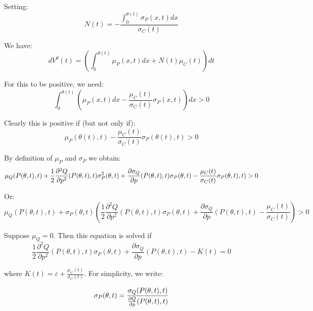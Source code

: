 \documentclass{article}
\begin{document}
Setting:%
\begin{equation*}
N(t)=-\frac{\int_{0}^{\theta (t)}\sigma _{P}(x,t)dx}{\sigma _{C}(t)}
\end{equation*}%
\bigskip

We have:%
\begin{equation*}
dV^{\theta }(t)=\left( \int_{0}^{\theta (t)}\mu _{P}(x,t)dx+N(t)\mu
_{C}(t)\right) dt
\end{equation*}

For this to be positive, we need:%
\begin{equation*}
\int_{0}^{\theta (t)}\left( \mu _{P}(x,t)dx-\frac{\mu _{C}(t)}{\sigma _{C}(t)%
}\sigma _{P}(x,t)\right) dx>0
\end{equation*}

Clearly this is positive if (but not only if):%
\begin{equation*}
\mu _{P}(\theta (t),t)-\frac{\mu _{C}(t)}{\sigma _{C}(t)}\sigma _{P}(\theta
(t),t)>0
\end{equation*}

By definition of $\mu _{P}$ and $\sigma _{P}$ we obtain:%
\begin{equation*}
\mu _{Q}(P(\theta ,t),t)+\frac{1}{2}\frac{\partial ^{2}Q}{\partial p^{2}}%
(P(\theta ,t),t)\sigma _{P}^{2}(\theta ,t)+\frac{\partial \sigma _{Q}}{%
\partial p}(P(\theta ,t),t)\sigma _{P}(\theta ,t)-\frac{\mu _{C}(t)}{\sigma
_{C}(t)}\sigma _{P}(\theta ,t),t)>0
\end{equation*}

Or:%
\begin{equation*}
\mu _{Q}(P(\theta ,t),t)+\sigma _{P}(\theta ,t)(\frac{1}{2}\frac{\partial
^{2}Q}{\partial p^{2}}(P(\theta ,t),t)\sigma _{P}(\theta ,t)+\frac{\partial
\sigma _{Q}}{\partial p}(P(\theta ,t),t)-\frac{\mu _{C}(t)}{\sigma _{C}(t)}%
)>0
\end{equation*}

Suppose $\mu _{Q}=0$. Then this equation is solved if%
\begin{equation*}
\frac{1}{2}\frac{\partial ^{2}Q}{\partial p^{2}}(P(\theta ,t),t)\sigma
_{P}(\theta ,t)+\frac{\partial \sigma _{Q}}{\partial p}(P(\theta
,t),t)-K(t)=0
\end{equation*}

where $K(t)=\varepsilon +\frac{\mu _{C}(t)}{\sigma _{C}(t)}$. For
simplicity, we write:

\begin{equation*}
\sigma _{P}(\theta ,t)=\frac{\sigma _{Q}(P(\theta ,t),t)}{\frac{\partial Q}{%
\partial p}(P(\theta ,t),t)}
\end{equation*}
\end{document}
